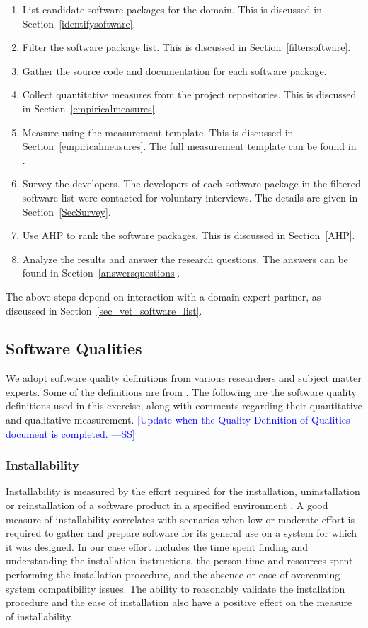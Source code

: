\documentclass[final, 3p, times, authoryear]{elsarticle}
\newcommand{\authornote}[3]{\textcolor{#1}{[#3 ---#2]}}
\newcommand{\authornote}[3]{}
\newcommand{\wss}[1]{\authornote{blue}{SS}{#1}} %
\begin{document}
\begin{enumerate}
	\item List candidate software packages for the domain. This is discussed in
	Section~\ref{identifysoftware}.
	\item Filter the software package list. This is discussed in
	Section~\ref{filtersoftware}.
	\item Gather the source code and documentation for each software package.
	\item Collect quantitative measures from the project repositories. This is
	discussed in Section~\ref{empiricalmeasures}.
	\item Measure using the measurement template. This is discussed in
	Section~\ref{empiricalmeasures}. The full measurement template can be found
	in \citet{SmithEtAl2021}.
	\item Survey the developers. The developers of each software package in the
	filtered software list were contacted for voluntary interviews. The details
	are given in Section~\ref{SecSurvey}.
	\item Use AHP to rank the software packages. This is discussed in
	Section~\ref{AHP}.
	\item Analyze the results and answer the research questions. The answers can
	be found in Section~\ref{answersquestions}.
\end{enumerate}

The above steps depend on interaction with a domain expert partner, as discussed
in Section~\ref{sec_vet_software_list}.

\subsection{Software Qualities} \label{softwarequalities}

We adopt software quality definitions from various researchers and subject
matter experts. Some of the definitions are from \cite{Smithetal2020}. The
following are the software quality definitions used in this exercise, along with
comments regarding their quantitative and qualitative measurement.  \wss{Update
when the Quality Definition of Qualities document is completed.}

\subsubsection{Installability}

Installability is measured by the effort required for the installation,
uninstallation or reinstallation of a software product in a specified
environment \citep{ISO/IEC25010, lenhard2013measuring}. A good measure of
installability correlates with scenarios when low or moderate effort is required
to gather and prepare software for its general use on a system for which it was
designed. In our case effort includes the time spent finding and understanding
the installation instructions, the person-time and resources spent performing
the installation procedure, and the absence or ease of overcoming system
compatibility issues. The ability to reasonably validate the installation
procedure and the ease of installation also have a positive effect on the
measure of installability.
\end{document}
